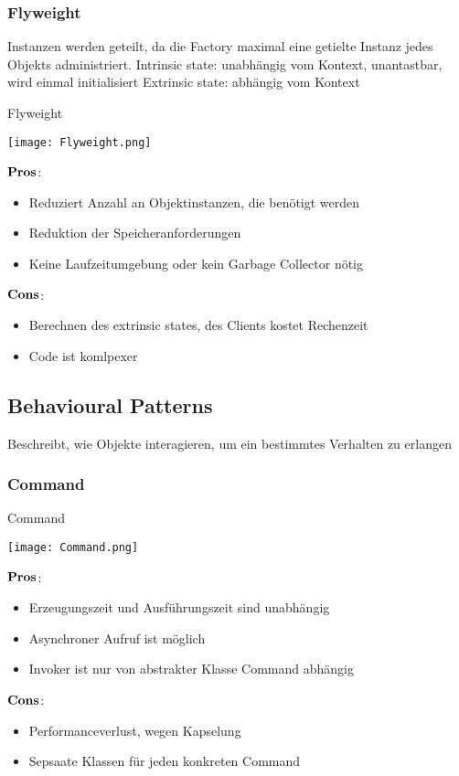\subsubsection{Flyweight}
Instanzen werden geteilt, da die Factory maximal eine getielte Instanz jedes Objekts administriert. \newline
Intrinsic state: unabhängig vom Kontext, unantastbar, wird einmal initialisiert \newline
Extrinsic state: abhängig vom Kontext
\begin{table}[H]
\caption{Flyweight}
\texttt{[image: Flyweight.png]}	
\end{table}
\begin{multicols}{2}
$\bold{Pros}$:
\begin{itemize}
	\item Reduziert Anzahl an Objektinstanzen, die benötigt werden
	\item Reduktion der Speicheranforderungen
	\item Keine Laufzeitumgebung oder kein Garbage Collector nötig
\end{itemize}
\columnbreak
$\bold{Cons}$:
\begin{itemize}
	\item Berechnen des extrinsic states, des Clients kostet Rechenzeit
	\item Code ist komlpexer
\end{itemize}
\end{multicols}
\subsection{Behavioural Patterns}
Beschreibt, wie Objekte interagieren, um ein bestimmtes Verhalten zu erlangen
\subsubsection{Command}
\begin{table}[H]
\caption{Command}
\texttt{[image: Command.png]}
\end{table}
\begin{multicols}{2}
$\bold{Pros}$:
\begin{itemize}
	\item Erzeugungszeit und Ausführungszeit sind unabhängig
	\item Asynchroner Aufruf ist möglich
	\item Invoker ist nur von abstrakter Klasse Command abhängig
\end{itemize}
\columnbreak
$\bold{Cons}$:
\begin{itemize}
	\item Performanceverlust, wegen Kapselung
	\item Sepsaate Klassen für jeden konkreten Command
\end{itemize}
\end{multicols}
